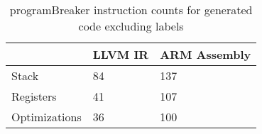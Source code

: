 \begin{table}[h!]
\centering
\begin{tabular}{p{}p{}p{}}
  \hline
 & LLVM IR & ARM Assembly \\ 
  \hline
Stack &  84 & 137 \\ 
  Registers &  41 & 107 \\ 
  Optimizations &  36 & 100 \\ 
   \hline
\end{tabular}
\caption{programBreaker instruction counts for generated code excluding labels}
\end{table}
